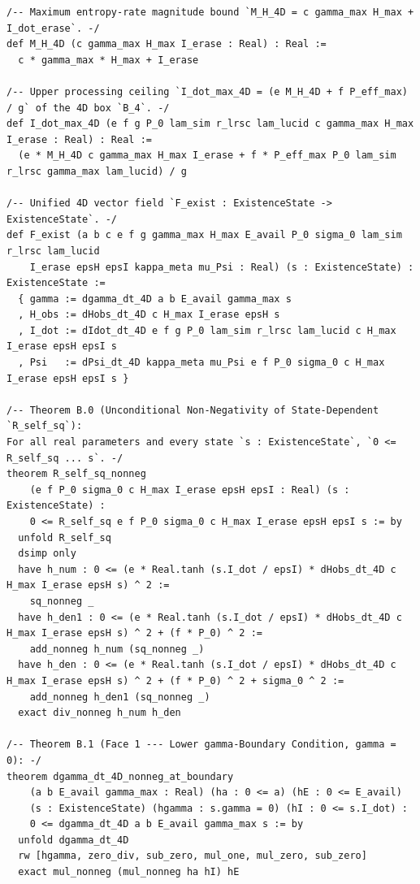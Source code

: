 \documentclass[11pt,a4paper]{article}
\theoremstyle{definition}
\begin{document}
\begin{lstlisting}[language=Lean4]
/-- Maximum entropy-rate magnitude bound `M_H_4D = c gamma_max H_max + I_dot_erase`. -/
def M_H_4D (c gamma_max H_max I_erase : Real) : Real :=
  c * gamma_max * H_max + I_erase

/-- Upper processing ceiling `I_dot_max_4D = (e M_H_4D + f P_eff_max) / g` of the 4D box `B_4`. -/
def I_dot_max_4D (e f g P_0 lam_sim r_lrsc lam_lucid c gamma_max H_max I_erase : Real) : Real :=
  (e * M_H_4D c gamma_max H_max I_erase + f * P_eff_max P_0 lam_sim r_lrsc gamma_max lam_lucid) / g

/-- Unified 4D vector field `F_exist : ExistenceState -> ExistenceState`. -/
def F_exist (a b c e f g gamma_max H_max E_avail P_0 sigma_0 lam_sim r_lrsc lam_lucid
    I_erase epsH epsI kappa_meta mu_Psi : Real) (s : ExistenceState) : ExistenceState :=
  { gamma := dgamma_dt_4D a b E_avail gamma_max s
  , H_obs := dHobs_dt_4D c H_max I_erase epsH s
  , I_dot := dIdot_dt_4D e f g P_0 lam_sim r_lrsc lam_lucid c H_max I_erase epsH epsI s
  , Psi   := dPsi_dt_4D kappa_meta mu_Psi e f P_0 sigma_0 c H_max I_erase epsH epsI s }

/-- Theorem B.0 (Unconditional Non-Negativity of State-Dependent `R_self_sq`):
For all real parameters and every state `s : ExistenceState`, `0 <= R_self_sq ... s`. -/
theorem R_self_sq_nonneg
    (e f P_0 sigma_0 c H_max I_erase epsH epsI : Real) (s : ExistenceState) :
    0 <= R_self_sq e f P_0 sigma_0 c H_max I_erase epsH epsI s := by
  unfold R_self_sq
  dsimp only
  have h_num : 0 <= (e * Real.tanh (s.I_dot / epsI) * dHobs_dt_4D c H_max I_erase epsH s) ^ 2 :=
    sq_nonneg _
  have h_den1 : 0 <= (e * Real.tanh (s.I_dot / epsI) * dHobs_dt_4D c H_max I_erase epsH s) ^ 2 + (f * P_0) ^ 2 :=
    add_nonneg h_num (sq_nonneg _)
  have h_den : 0 <= (e * Real.tanh (s.I_dot / epsI) * dHobs_dt_4D c H_max I_erase epsH s) ^ 2 + (f * P_0) ^ 2 + sigma_0 ^ 2 :=
    add_nonneg h_den1 (sq_nonneg _)
  exact div_nonneg h_num h_den

/-- Theorem B.1 (Face 1 --- Lower gamma-Boundary Condition, gamma = 0): -/
theorem dgamma_dt_4D_nonneg_at_boundary
    (a b E_avail gamma_max : Real) (ha : 0 <= a) (hE : 0 <= E_avail)
    (s : ExistenceState) (hgamma : s.gamma = 0) (hI : 0 <= s.I_dot) :
    0 <= dgamma_dt_4D a b E_avail gamma_max s := by
  unfold dgamma_dt_4D
  rw [hgamma, zero_div, sub_zero, mul_one, mul_zero, sub_zero]
  exact mul_nonneg (mul_nonneg ha hI) hE


\end{lstlisting}
\end{document}
